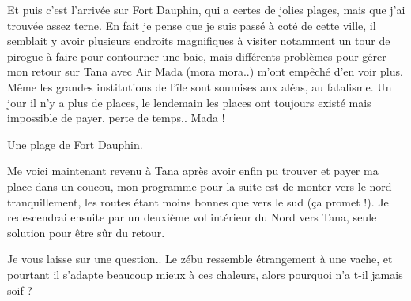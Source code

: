 \begin{multicols}{2}

Et puis c'est l'arrivée sur Fort Dauphin, qui a certes de jolies plages, mais que j'ai trouvée assez terne. En fait je pense que je suis passé à coté de cette ville, il semblait y avoir plusieurs endroits magnifiques à visiter notamment un tour de pirogue à faire pour contourner une baie, mais différents problèmes pour gérer mon retour sur Tana avec Air Mada (mora mora..) m'ont empêché d'en voir plus. Même les grandes institutions de l'île sont soumises aux aléas, au fatalisme. Un jour il n'y a plus de places, le lendemain les places ont toujours existé mais impossible de payer, perte de temps.. Mada !

Une plage de Fort Dauphin.


Me voici maintenant revenu à Tana après avoir enfin pu trouver et payer ma place dans un coucou, mon programme pour la suite est de monter vers le nord tranquillement, les routes étant moins bonnes que vers le sud (ça promet !). Je redescendrai ensuite par un deuxième vol intérieur du Nord vers Tana, seule solution pour être sûr du retour.

Je vous laisse sur une question.. Le zébu ressemble étrangement à une vache, et pourtant il s'adapte beaucoup mieux à ces chaleurs, alors pourquoi n'a t-il jamais soif ?

\end{multicols}


